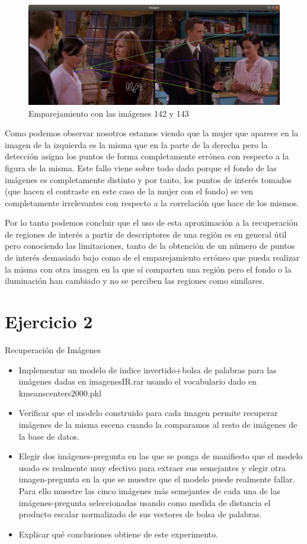 \documentclass[12pt,a4paper]{article}
\begin{document}
\begin{figure}[H]
  \centering
  \includegraphics[scale=0.35]{./Imagenes/Ejercicio1-4.png}
  \caption{Emparejamiento con las imágenes 142 y 143}
\end{figure}

Como podemos observar nosotros estamos viendo que la mujer que aparece en la imagen de la izquierda es la misma que en la parte de la derecha pero la detección asigna los puntos de forma completamente errónea con respecto a la figura de la misma. Este fallo viene sobre todo dado porque el fondo de las imágenes es completamente distinto y por tanto, los puntos de interés tomados (que hacen el contraste en este caso de la mujer con el fondo) se ven completamente irrelevantes con respecto a la correlación que hace de los mismos.

\vspace{10px}

Por lo tanto podemos concluir que el uso de esta aproximación a la recuperación de regiones de interés a partir de descriptores de una región es en general útil pero conociendo las limitaciones, tanto de la obtención de un número de puntos de interés demasiado bajo como de el emparejamiento erróneo que pueda realizar la misma con otra imagen en la que sí comparten una región pero el fondo o la iluminación han cambiado y no se perciben las regiones como similares.

\section{Ejercicio 2}
Recuperación de Imágenes
\begin{itemize}
  \item Implementar un modelo de índice invertido+bolsa de palabras para las imágenes dadas en imagenesIR.rar usando el vocabulario dado en kmeanscenters2000.pkl
  \item Verificar que el modelo construido para cada imagen permite recuperar imágenes de la misma escena cuando la comparamos al resto de imágenes de la base de datos.
  \item Elegir dos imágenes-pregunta en las que se ponga de manifiesto que el modelo usado es realmente muy efectivo para extraer sus semejantes y elegir otra imagen-pregunta en la que se muestre que el modelo puede realmente fallar. Para ello muestre las cinco imágenes más semejantes de cada una de las imágenes-pregunta seleccionadas usando como medida de distancia el producto escalar normalizado de sus vectores de bolsa de palabras.
  \item Explicar qué conclusiones obtiene de este experimento.
\end{itemize}
\end{document}
